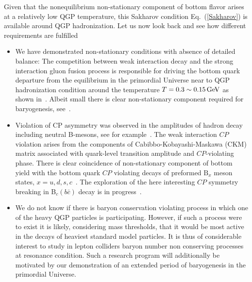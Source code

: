 Given that the nonequilibrium non-stationary component of bottom flavor arises at a relatively low QGP temperature, {\color{black}this Sakharov condition Eq.~(\ref{Sakharov}) is available around QGP hadronization.} Let us now look back and see how different requirements are fulfilled
\begin{itemize}
\item
 We have demonstrated non-stationary conditions with absence of detailed balance: The competition between weak interaction decay and the strong interaction gluon fusion process is responsible for driving the bottom quark departure from the equilibrium in the primordial Universe near to QGP hadronization condition around the temperature $T=0.3\sim0.15\text{\,GeV}$ as shown in~. Albeit small there is clear non-stationary component required for baryogenesis, see~.
\item Violation of CP asymmetry was observed in the amplitudes of hadron decay including neutral B-mesons, see for example~\cite{LHCb:2019jta,LHCb:2020vut}. The weak interaction $CP$ violation arises from the components of Cabibbo-Kobayashi-Maskawa (CKM) matrix associated with quark-level transition amplitude and $CP$-violating phase. There is clear coincidence of non-stationary component of bottom yield with the bottom quark $CP$ violating decays of preformed $\mathrm{B}_x$ meson states, $x=u,d,s,c$~\cite{Karsch:1987pv,Brambilla:2010vq,Aarts:2011sm,Brambilla:2017zei,Bazavov:2018wmo,Offler:2019eij}. The exploration of the here interesting $CP$ symmetry breaking in B$_c(b\bar c)$ decay is in progress~\cite{ParticleDataGroup:2022pth,Tully:2019ltb,HFLAV:2019otj}.
\item
We do not know if there is baryon conservation violating process in which one of the heavy QGP particles is participating. However, if such a process were to exist it is likely, considering mass thresholds, that it would be most active in the decays of heaviest standard model particles. It is thus of considerable interest to study in lepton colliders baryon number non conserving processes at resonance condition. Such a research program will additionally be motivated by our demonstration of an extended period of baryogenesis in the primordial Universe. 
\end{itemize}

